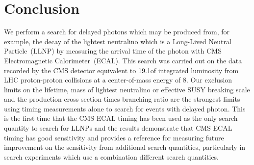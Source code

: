 \chapter{Conclusion}
\label{conclusion_chapter}
We perform a search for delayed photons which may be produced from, for example, the decay of the lightest neutralino which is a Long-Lived Neutral Particle~(LLNP) by measuring the arrival time of the photon with CMS Electromagnetic Calorimeter~(ECAL). This search was carried out on the data recorded by the CMS detector equivalent to 19.1\fbinv of integrated luminosity  from LHC  proton-proton collisions at a center-of-mass energy of $8$\TeV. 
\newline
Our exclusion limits on the lifetime, mass of lightest neutralino or effective SUSY breaking scale and the production cross section times branching ratio are the strongest limits using timing measurements alone to search for events with delayed photon. This is the first time that the CMS ECAL timing has been used as the only search quantity to search for LLNPs and the results demonstrate that CMS ECAL timing has good sensitivity and provides a reference for measuring future improvement on the sensitivity from additional search quantities, particularly in search experiments which use a combination different search quantities. %
